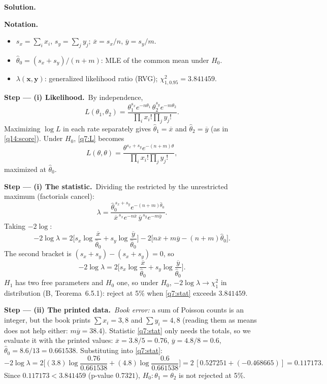 \documentclass[11pt,a4paper]{article}
\numberwithin{equation}{questao}   %
\newenvironment{notacao}{\par\smallskip\noindent\textbf{Notation.}\begin{itemize}[leftmargin=1.4em,topsep=1pt,itemsep=0pt]\small}{\end{itemize}}
\newcommand{\passo}[2]{\par\smallskip\noindent\textbf{Step --- #1.}~#2}
\newcommand{\solhead}{\par\medskip\noindent{\color{blue!55!black}\rule{\linewidth}{0.3pt}}\par\noindent\textbf{Solution.}}
\newcommand{\1}{\mathbf{1}}
\begin{document}
\begin{sol}
\solhead
\begin{notacao}
\item $s_x=\sum_ix_i$, $s_y=\sum_jy_j$; $\overline x=s_x/n$, $\overline y=s_y/m$.
\item $\hat\theta_0=(s_x+s_y)/(n+m)$: MLE of the common mean under $H_0$.
\item $\lambda(\mathbf x,\mathbf y)$: generalized likelihood ratio (RVG); $\chi^2_{1,0.95}=3.841459$.
\end{notacao}

\passo{(i) Likelihood}{By independence,}
\begin{equation}\label{q7:L}
L(\theta_1,\theta_2)=\frac{\theta_1^{s_x}e^{-n\theta_1}\,\theta_2^{s_y}e^{-m\theta_2}}{\prod_ix_i!\prod_jy_j!}.
\end{equation}
Maximizing $\log L$ in each rate separately gives $\hat\theta_1=\overline x$ and
$\hat\theta_2=\overline y$ (as in \eqref{q14:score}). Under $H_0$, \eqref{q7:L} becomes
\[
L(\theta,\theta)=\frac{\theta^{s_x+s_y}e^{-(n+m)\theta}}{\prod_ix_i!\prod_jy_j!},
\]
maximized at $\hat\theta_0$.

\passo{(i) The statistic}{Dividing the restricted by the unrestricted maximum (factorials cancel):}
\[
\lambda=\frac{\hat\theta_0^{\,s_x+s_y}e^{-(n+m)\hat\theta_0}}{\overline x^{\,s_x}e^{-n\overline x}\,\overline y^{\,s_y}e^{-m\overline y}} .
\]
Taking $-2\log$:
\[
-2\log\lambda=2\Big[s_x\log\frac{\overline x}{\hat\theta_0}+s_y\log\frac{\overline y}{\hat\theta_0}\Big]
-2\big[n\overline x+m\overline y-(n+m)\hat\theta_0\big].
\]
The second bracket is $(s_x+s_y)-(s_x+s_y)=0$, so
\begin{equation}\label{q7:stat}
-2\log\lambda=2\Big[s_x\log\frac{\overline x}{\hat\theta_0}+s_y\log\frac{\overline y}{\hat\theta_0}\Big].
\end{equation}
$H_1$ has two free parameters and $H_0$ one, so under $H_0$, $-2\log\lambda\to\chi^2_1$ in
distribution (B, Teorema~6.5.1): reject at 5\% when \eqref{q7:stat} exceeds $3.841459$.

\passo{(ii) The printed data}{\emph{Book error:} a sum of Poisson counts is an integer, but the book
prints $\sum x_i=3{,}8$ and $\sum y_i=4{,}8$ (reading them as means does not help either:
$m\overline y=38.4$). Statistic \eqref{q7:stat} only needs the totals, so we evaluate it with the
printed values: $\overline x=3.8/5=0.76$, $\overline y=4.8/8=0.6$, $\hat\theta_0=8.6/13=0.661538$.}
Substituting into \eqref{q7:stat}:
\[
-2\log\lambda=2\Big[(3.8)\log\frac{0.76}{0.661538}+(4.8)\log\frac{0.6}{0.661538}\Big]
=2\,[0.527251+(-0.468665)]=0.117173 .
\]
Since $0.117173<3.841459$ (p-value $0.7321$), $H_0:\theta_1=\theta_2$ is not rejected at 5\%.


\end{sol}
\end{document}
